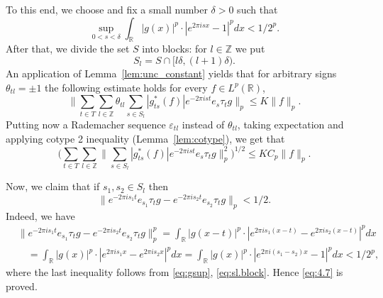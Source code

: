 \documentclass[reqno,a4paper,12pt]{amsart}
\numberwithin{equation}{section}
\numberwithin{figure}{section}
\newcommand\R{\mathbb{R}}
\newcommand\Z{\mathbb{Z}}
\newcommand\del{\delta}
\newcommand\1{\mathds{1}}
\newcommand\eps{\varepsilon}
\newcommand{\TTT}{T}
\newcommand{\SSS}{S}
\newcommand{\ts}{\tau}
\renewcommand\le{\leqslant}
\theoremstyle{plain}
\newcommand{\lemref}[1]{Lemma~\ref{#1}}
\theoremstyle{definition}
\begin{document}
To this end, we choose and fix a small number $\del > 0$ such that
\begin{equation}
\label{eq:gsup}
\sup_{0 < s < \del}
\int_{\R} |g(x)|^p \cdot |e^{2 \pi i s x} - 1|^p   dx < 1/2^p.
\end{equation}
After that, we divide the set $\SSS$ into blocks: for $l\in\Z$ we put
\begin{equation}
\label{eq:sl.block}
\SSS_l = \SSS\cap [l\delta, (l+1)\delta).
\end{equation}
An application of \lemref{lem:unc_constant} yields that for arbitrary signs $\theta_{tl} = \pm 1$ the following estimate holds for every $f\in L^p(\R)$,
\begin{equation}
\Big\| \sum_{t\in \TTT} \sum_{l\in\Z} \theta_{tl} \sum_{s\in \SSS_l} |g_{ts}^*(f)|e^{-2\pi i s t} e_s \ts_t g \Big\|_p\le K\|f\|_p.
\end{equation}
Putting now a Rademacher sequence $\eps_{tl}$ instead of $\theta_{tl}$, taking expectation and applying cotype 2 inequality (\lemref{lem:cotype}), we get that
\begin{equation}\label{eq:4.6}
\Big(\sum_{t\in \TTT} \sum_{l\in \Z} \Big\| \sum_{s\in \SSS_l} |g_{ts}^*(f)|e^{-2\pi i s t}e_s \ts_t g \Big\|_p^2\Big)^{1/2}\le KC_p\|f\|_p.
\end{equation}

Now, we claim that if $s_1, s_2\in \SSS_l$ then
\begin{equation}\label{eq:4.7}
\|e^{-2\pi i s_1 t} e_{s_1} \ts_t g - e^{-2\pi i s_2 t} e_{s_2} \ts_t g\|_p < 1/2.
\end{equation}
Indeed, we have
\begin{align}
&\|e^{-2\pi i s_1 t} e_{s_1} \ts_t g - e^{-2\pi i s_2 t} e_{s_2} \ts_t g\|^p_p=\int_\R |g(x-t)|^p\cdot |e^{2\pi i s_1 (x-t)} - e^{2\pi i s_2(x-t)}|^p dx\\
& \quad =\int_\R |g(x)|^p\cdot |e^{2\pi i s_1 x} - e^{2\pi i s_2 x}|^p dx = \int_\R |g(x)|^p\cdot |e^{2\pi i (s_1-s_2)x}-1|^p dx  < 1/2^p,
\end{align} 
where the last inequality follows from \eqref{eq:gsup}, \eqref{eq:sl.block}. Hence \eqref{eq:4.7} is proved.
\end{document}
